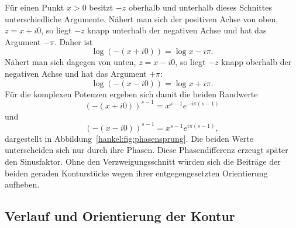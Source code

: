 Für einen Punkt $x>0$ besitzt $-z$ oberhalb und unterhalb dieses Schnittes unterschiedliche Argumente. 
Nähert man sich der positiven Achse von oben, $z=x+i0$, so liegt $-z$ knapp unterhalb der negativen Achse und hat das
Argument $-\pi$. 
Daher ist
\begin{equation}
\log(-(x+i0))
=
\log x-i\pi.
\label{hankel:eq:log-oben}
\end{equation}
Nähert man sich dagegen von unten, $z=x-i0$, so liegt $-z$ knapp oberhalb der negativen Achse und hat das Argument $+\pi$:
\begin{equation}
\log(-(x-i0))
=
\log x+i\pi.
\label{hankel:eq:log-unten}
\end{equation}
Für die komplexen Potenzen ergeben sich damit die beiden Randwerte
\begin{equation}
(-(x+i0))^{s-1}
=
x^{s-1}e^{-i\pi(s-1)}
\label{hankel:eq:potenz-oben}
\end{equation}
und
\begin{equation}
(-(x-i0))^{s-1}
=
x^{s-1}e^{i\pi(s-1)},
\label{hankel:eq:potenz-unten}
\end{equation}
dargestellt in Abbildung~\ref{hankel:fig:phasensprung}.
Die beiden Werte unterscheiden sich nur durch ihre Phasen. Diese Phasendifferenz erzeugt später den Sinusfaktor. 
Ohne den Verzweigungsschnitt würden sich die Beiträge der beiden geraden Konturstücke wegen ihrer entgegengesetzten Orientierung aufheben.


%		
%		

\subsection{Verlauf und Orientierung der Kontur}

